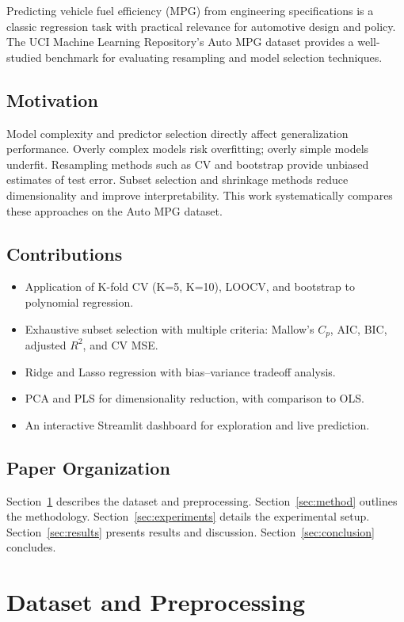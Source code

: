 \documentclass[conference]{IEEEtran}
\begin{document}
Predicting vehicle fuel efficiency (MPG) from engineering specifications is a classic regression task with practical relevance for automotive design and policy. The UCI Machine Learning Repository's Auto MPG dataset provides a well-studied benchmark for evaluating resampling and model selection techniques.

\subsection{Motivation}
Model complexity and predictor selection directly affect generalization performance. Overly complex models risk overfitting; overly simple models underfit. Resampling methods such as CV and bootstrap provide unbiased estimates of test error. Subset selection and shrinkage methods reduce dimensionality and improve interpretability. This work systematically compares these approaches on the Auto MPG dataset.

\subsection{Contributions}
\begin{itemize}
    \item Application of K-fold CV (K=5, K=10), LOOCV, and bootstrap to polynomial regression.
    \item Exhaustive subset selection with multiple criteria: Mallow's $C_p$, AIC, BIC, adjusted $R^2$, and CV MSE.
    \item Ridge and Lasso regression with bias--variance tradeoff analysis.
    \item PCA and PLS for dimensionality reduction, with comparison to OLS.
    \item An interactive Streamlit dashboard for exploration and live prediction.
\end{itemize}

\subsection{Paper Organization}
Section~\ref{sec:data} describes the dataset and preprocessing. Section~\ref{sec:method} outlines the methodology. Section~\ref{sec:experiments} details the experimental setup. Section~\ref{sec:results} presents results and discussion. Section~\ref{sec:conclusion} concludes.

\section{Dataset and Preprocessing}
\label{sec:data}
\end{document}
